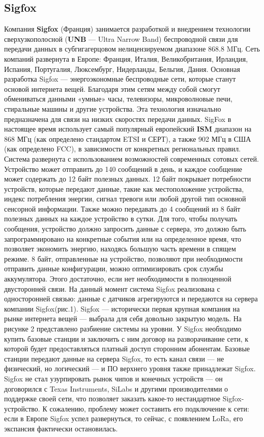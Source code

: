 \subsection{Sigfox}

Компания \textbf{Sigfox} (Франция) занимается разработкой и внедрением технологии сверхузкополосной (\textbf{UNB} — Ultra Narrow Band) беспроводной связи для передачи данных в субгигагерцовом нелицензируемом диапазоне 868.8 MГц. Сеть компаний развернута в Европе: Франция, Италия, Великобритания, Ирландия, Испания, Португалия, Люксембург, Нидерланды, Бельгия, Дания. Основная разработка Sigfox — энергоэкономные беспроводные сети, которые станут основой интернета вещей. Благодаря этим сетям между собой смогут обмениваться данными «умные» часы, телевизоры, микроволновые печи, стиральные машины и другие устройства. Эта технология изначально предназначена для связи на низких скоростях передачи данных. SigFox в настоящее время использует самый популярный европейский \textbf{ISM} диапазон на 868 МГц (как определено стандартом ETSI и СЕРТ), а также 902 МГц в США (как определено FCC), в зависимости от конкретных региональных правил. Система развернута с использованием возможностей современных сотовых сетей.
Устройство может отправить до 140 сообщений в день, и каждое сообщение может содержать до 12 байт полезных данных. 12 байт покрывает потребности устройств, которые передают данные, такие как местоположение устройства, индекс потребления энергии, сигнал тревоги или любой другой тип основной сенсорной информации. Также можно передавать до 4 сообщений из 8 байт полезных данных на каждое устройство в сутки. Для того, чтобы получать сообщения, устройство должно запросить данные с сервера, это должно быть запрограммировано на конкретные события или на определенное время, что позволяет экономить энергию, находясь большую часть времени в спящем режиме. 8 байт, отправленные на устройство, позволяют при необходимости отправить данные конфигурации, можно оптимизировать срок службы аккумулятора. Этого достаточно, если нет необходимости в полноценной двусторонней связи. На данный момент система Sigfox реализована с односторонней связью: данные с датчиков агрегируются и передаются на сервера компании Sigfox(рис.1). 
Sigfox — исторически первая крупная компания на рынке интернета вещей — выбрала для себя довольно закрытую модель. На рисунке 2 представлено разбиение системы на уровни.  У Sigfox необходимо купить базовые станции и заключить с ним договор на разворачивание сети, к которой будет предоставляться платный доступ сторонним абонентам. Базовые станции передают данные на сервера Sigfox, то есть канал связи — не физический, но логический — и ПО верхнего уровня также принадлежат Sigfox. Sigfox не стал узурпировать рынок чипов и конечных устройств — он договорился с Texas Instruments, SiLabs и другими производителями о поддержке своей сети, что позволяет заказать какое-то нестандартное Sigfox-устройство. К сожалению, проблему может составить его подключение к сети: если в Европе Sigfox успел развернуться, то сейчас, с появлением LoRa, его экспансия фактически остановилась.
